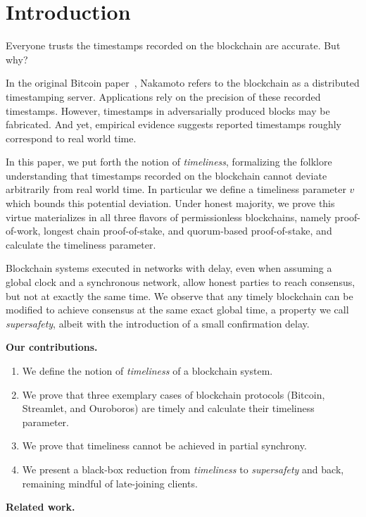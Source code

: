 \section{Introduction}
Everyone trusts the timestamps recorded on the
blockchain are accurate. But why?

In the original Bitcoin paper~\cite{bitcoin}, Nakamoto refers to the
blockchain as a distributed timestamping server.
Applications rely on the precision of these recorded timestamps.
However, timestamps in adversarially produced blocks may be fabricated.
And yet, empirical evidence suggests reported timestamps roughly correspond
to real world time.

In this paper, we put forth the notion of \emph{timeliness}, formalizing the folklore
understanding that timestamps recorded on the blockchain cannot deviate arbitrarily
from real world time. In particular we define a timeliness parameter $v$ which bounds
this potential deviation. Under honest majority, we prove this virtue materializes in all three flavors of
permissionless blockchains, namely proof-of-work,
longest chain proof-of-stake, and quorum-based proof-of-stake, and calculate the
timeliness parameter.

Blockchain systems executed in networks with delay, even when assuming a global clock and
a synchronous network, allow honest parties to reach consensus, but not at exactly
the same time. We observe that any timely blockchain can be modified to achieve
consensus at the same exact global time, a property we call \emph{supersafety},
albeit with the introduction of a small confirmation delay.

\noindent
\textbf{Our contributions.}

\begin{enumerate}
  \item We define the notion of \emph{timeliness} of a blockchain system.
  \item We prove that three exemplary cases of blockchain protocols (Bitcoin, Streamlet, and Ouroboros)
        are timely and calculate their timeliness parameter.
  \item We prove that timeliness cannot be achieved in partial synchrony.
  \item We present a black-box reduction from \emph{timeliness} to \emph{supersafety} and back,
        remaining mindful of late-joining clients.
\end{enumerate}

\noindent
\textbf{Related work.}
